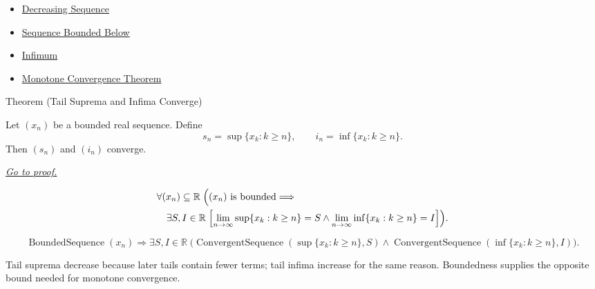 \begin{dependencies}
\begin{itemize}
  \item \hyperref[def:decreasing-sequence]{Decreasing Sequence}
  \item \hyperref[def:sequence-bounded-below]{Sequence Bounded Below}
  \item \hyperref[def:infimum]{Infimum}
  \item \hyperref[thm:monotone-convergence-theorem]{Monotone Convergence Theorem}
\end{itemize}
\end{dependencies}


\begin{theorembox}{Theorem (Tail Suprema and Infima Converge)}
\begin{theorem}
\label{thm:tail-suprema-and-infima-converge}
Let $(x_n)$ be a bounded real sequence. Define
\[
  s_n=\sup\{x_k:k\ge n\},
  \qquad
  i_n=\inf\{x_k:k\ge n\}.
\]
Then $(s_n)$ and $(i_n)$ converge.

\smallskip
\noindent
\hyperref[prf:tail-suprema-and-infima-converge]{\textit{Go to proof.}}
\end{theorem}
\end{theorembox}

\begin{remark*}
\[
\begin{aligned}
&\forall (x_n)\subseteq\mathbb{R}\;
\Bigl(
  (x_n)\text{ is bounded}
  \Longrightarrow\\
&\quad
  \exists S,I\in\mathbb{R}\;
  \Bigl[
    \lim_{n\to\infty}\sup\{x_k:k\ge n\}=S
    \land
    \lim_{n\to\infty}\inf\{x_k:k\ge n\}=I
  \Bigr]
\Bigr).
\end{aligned}
\]
\end{remark*}

\begin{remark*}
\[
\operatorname{BoundedSequence}(x_n)
\Longrightarrow
\exists S,I\in\mathbb{R}\;
\bigl(
  \operatorname{ConvergentSequence}(\sup\{x_k:k\ge n\},S)
  \land
  \operatorname{ConvergentSequence}(\inf\{x_k:k\ge n\},I)
\bigr).
\]
\end{remark*}

\begin{remark*}[Interpretation]
Tail suprema decrease because later tails contain fewer terms; tail infima
increase for the same reason. Boundedness supplies the opposite bound needed
for monotone convergence.
\end{remark*}

